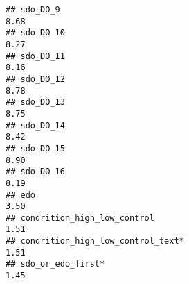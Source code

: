 \documentclass[
]{article}
\begin{document}
\begin{verbatim}
## sdo_DO_9                                                                                                                                                                                                                      8.68
## sdo_DO_10                                                                                                                                                                                                                     8.27
## sdo_DO_11                                                                                                                                                                                                                     8.16
## sdo_DO_12                                                                                                                                                                                                                     8.78
## sdo_DO_13                                                                                                                                                                                                                     8.75
## sdo_DO_14                                                                                                                                                                                                                     8.42
## sdo_DO_15                                                                                                                                                                                                                     8.90
## sdo_DO_16                                                                                                                                                                                                                     8.19
## edo                                                                                                                                                                                                                           3.50
## condrition_high_low_control                                                                                                                                                                                                   1.51
## condrition_high_low_control_text*                                                                                                                                                                                             1.51
## sdo_or_edo_first*                                                                                                                                                                                                             1.45

\end{verbatim}
\end{document}
